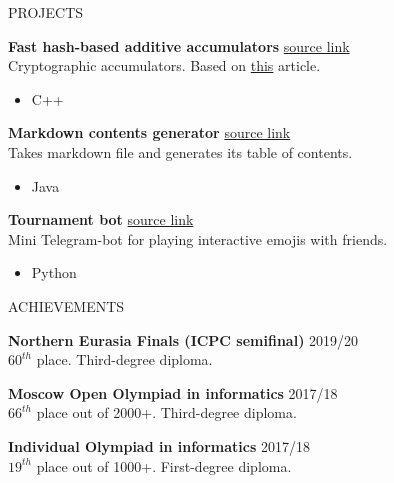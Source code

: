 \documentclass{resume} %
\begin{document}

\begin{rSection}{PROJECTS}
\vspace{-1.25em}
\item 
\textbf{Fast hash-based additive accumulators} \hfill \href{https://github.com/Darui99/AdditiveAccumulator}{source link}\\
Cryptographic accumulators. Based on \href{https://github.com/bigspider/accumulator/blob/master/docs/paper-draft.pdf}{this} article.
 \begin{itemize}
    \itemsep -3pt {} 
     \item C++
 \end{itemize}
 
\item 
\textbf{Markdown contents generator} \hfill \href{https://github.com/Darui99/markdown-contents-generator}{source link}\\
Takes markdown file and generates its table of contents.
 \begin{itemize}
    \itemsep -3pt {} 
     \item Java
 \end{itemize}

\item 
\textbf{Tournament bot} \hfill \href{https://github.com/Darui99/telegram-game-bot}{source link}\\
Mini Telegram-bot for playing interactive emojis with friends.
 \begin{itemize}
    \itemsep -3pt {} 
     \item Python
 \end{itemize}
 
\end{rSection} 


\begin{rSection}{ACHIEVEMENTS} 

{\bf Northern Eurasia Finals (ICPC semifinal)} \hfill {2019/20}\\
$60^{th}$ place. Third-degree diploma.

{\bf Moscow Open Olympiad in informatics} \hfill {2017/18}\\
$66^{th}$ place out of 2000+. Third-degree diploma.

{\bf Individual Olympiad in informatics} \hfill {2017/18}\\
$19^{th}$ place out of 1000+. First-degree diploma.


\end{rSection}
\end{document}
